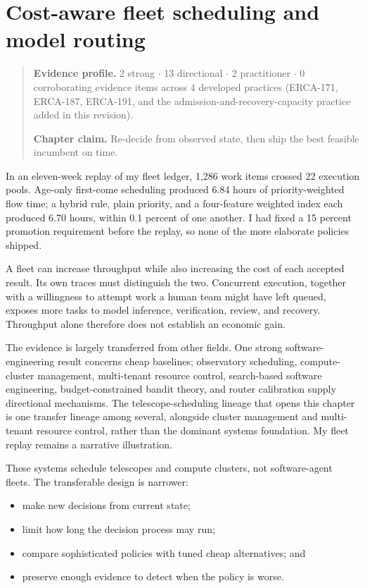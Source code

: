 \chapter{Cost-aware fleet scheduling and model routing}
\label{ch18-cost-aware-fleet-scheduling-model-routing}
\begin{quote}
\textbf{Evidence profile.} 2 strong \(\cdot\) 13 directional \(\cdot\) 2 practitioner \(\cdot\) 0 corroborating evidence items across 4 developed practices (ERCA-171, ERCA-187, ERCA-191, and the admission-and-recovery-capacity practice added in this revision).

\textbf{Chapter claim.} Re-decide from observed state, then ship the best feasible incumbent on time.
\end{quote}

In an eleven-week replay of my fleet ledger, 1,286 work items crossed 22 execution pools. Age-only first-come scheduling produced 6.84 hours of priority-weighted flow time; a hybrid rule, plain priority, and a four-feature weighted index each produced 6.70 hours, within 0.1 percent of one another. I had fixed a 15 percent promotion requirement before the replay, so none of the more elaborate policies shipped.

A fleet can increase throughput while also increasing the cost of each accepted result. Its own traces must distinguish the two. Concurrent execution, together with a willingness to attempt work a human team might have left queued, exposes more tasks to model inference, verification, review, and recovery. Throughput alone therefore does not establish an economic gain.

The evidence is largely transferred from other fields. One strong software-engineering result concerns cheap baselines; observatory scheduling, compute-cluster management, multi-tenant resource control, search-based software engineering, budget-constrained bandit theory, and router calibration supply directional mechanisms. The telescope-scheduling lineage that opens this chapter is one transfer lineage among several, alongside cluster management and multi-tenant resource control, rather than the dominant systems foundation. My fleet replay remains a narrative illustration.


These systems schedule telescopes and compute clusters, not software-agent fleets. The transferable design is narrower:

\begin{itemize}
\tightlist
\item
  make new decisions from current state;
\item
  limit how long the decision process may run;
\item
  compare sophisticated policies with tuned cheap alternatives; and
\item
  preserve enough evidence to detect when the policy is worse.
\end{itemize}

